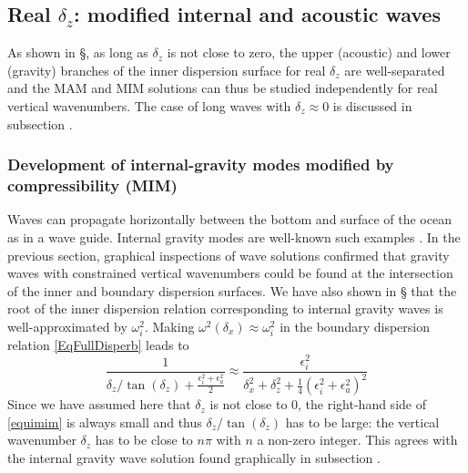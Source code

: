 \subsection{Real $\delta_z$: modified internal and acoustic waves}
As shown in \S{}, as long as $\delta_z$ is not close to zero, the upper (acoustic) and lower (gravity) branches of the inner dispersion surface for real $\delta_z$ are well-separated and the MAM and MIM solutions can thus be studied independently for real vertical wavenumbers. The case of long waves with $\delta_z \approx 0$ is discussed in subsection .
%
\subsubsection{Development of internal-gravity modes modified by compressibility (MIM)}
\label{SubSectionGraphicMIW}
Waves can propagate horizontally between the bottom and surface of the ocean as in a wave guide. Internal gravity modes are  well-known such examples \citep{gill_1982}. In the previous section, graphical inspections of wave solutions confirmed that gravity waves with constrained vertical wavenumbers could be found at the intersection of the inner and boundary dispersion surfaces.
We have also shown in \S{} that the root of the inner dispersion relation corresponding to internal gravity waves is well-approximated by $\omega_i^2$. Making $\omega^2(\delta_x) \approx\omega_i^2$ in the boundary dispersion relation \ref{EqFullDisperb} leads to 
%
\begin{equation}
		\frac{1}
{\delta_z/\tan(\delta_z)+\frac{\epsilon_i^2+\epsilon_a^2}{2}}
\approx
\frac{\epsilon_i^2}{\delta_x^2
	+\delta_z^2+\frac{1}{4}\left(
	\epsilon_i^2+\epsilon_a^2\right)^2}
\label{equimim}
\end{equation}
Since we have assumed here that $\delta_z$ is not close to 0, the right-hand side of \ref{equimim} is always small and thus $\delta_z/\tan(\delta_z)$ has to be large: the vertical wavenumber $\delta_z$ has to be close to $n\pi$ with $n$ a non-zero integer. This agrees with the internal gravity wave solution found graphically in subsection .\\
